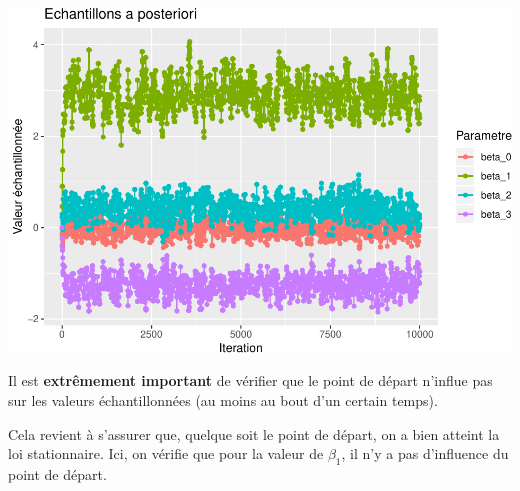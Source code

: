 \documentclass[]{article}
\newenvironment{Correction}%
  { \vspace{\baselineskip}\begin{mdframed}[backgroundcolor=my_green]}%
  {\end{mdframed}}
\begin{document}
\includegraphics{correction_bayes_mcmc_files/figure-latex/plot_premier_mcmc-1.pdf}

\begin{Correction}
Il est \textbf{extrêmement important} de vérifier que le point de départ n'influe pas sur les valeurs échantillonnées (au moins au bout d'un certain temps).

Cela revient à s'assurer que, quelque soit le point de départ, on a bien atteint la loi stationnaire. Ici, on vérifie que pour la valeur de $\beta_1$, il n'y a pas d'influence du point de départ.
\end{Correction}
\end{document}
